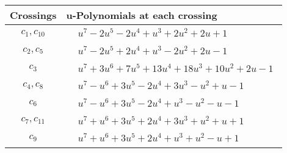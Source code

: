 \documentclass[1p]{elsarticle_modified}
\theoremstyle{definition}
\begin{document}
\begin{tabular}{m{50pt}|m{274pt}}
Crossings & \hspace{64pt}u-Polynomials at each crossing \\
\hline $$\begin{aligned}c_{1},c_{10}\end{aligned}$$&$\begin{aligned}
&u^7-2 u^5-2 u^4+u^3+2 u^2+2 u+1
\end{aligned}$\\
\hline $$\begin{aligned}c_{2},c_{5}\end{aligned}$$&$\begin{aligned}
&u^7-2 u^5+2 u^4+u^3-2 u^2+2 u-1
\end{aligned}$\\
\hline $$\begin{aligned}c_{3}\end{aligned}$$&$\begin{aligned}
&u^7+3 u^6+7 u^5+13 u^4+18 u^3+10 u^2+2 u-1
\end{aligned}$\\
\hline $$\begin{aligned}c_{4},c_{8}\end{aligned}$$&$\begin{aligned}
&u^7- u^6+3 u^5-2 u^4+3 u^3- u^2+u-1
\end{aligned}$\\
\hline $$\begin{aligned}c_{6}\end{aligned}$$&$\begin{aligned}
&u^7- u^6+3 u^5-2 u^4+u^3- u^2- u-1
\end{aligned}$\\
\hline $$\begin{aligned}c_{7},c_{11}\end{aligned}$$&$\begin{aligned}
&u^7+u^6+3 u^5+2 u^4+3 u^3+u^2+u+1
\end{aligned}$\\
\hline $$\begin{aligned}c_{9}\end{aligned}$$&$\begin{aligned}
&u^7+u^6+3 u^5+2 u^4+u^3+u^2- u+1
\end{aligned}$\\
\hline
\end{tabular}\\~\\
\newpage\renewcommand{\arraystretch}{1}
\end{document}
